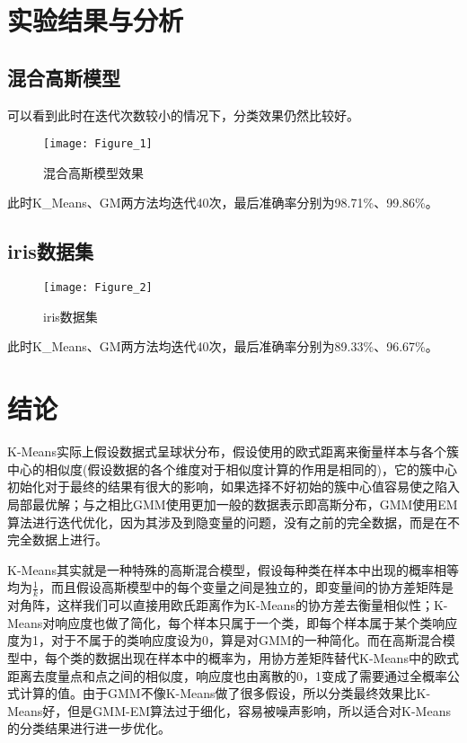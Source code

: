 \documentclass[withoutpreface,bwprint]{cumcmthesis}
\begin{document}
\section{实验结果与分析}
\subsection{混合高斯模型}
可以看到此时在迭代次数较小的情况下，分类效果仍然比较好。

\begin{figure}[H]
    \centering
    \texttt{[image: Figure\_1]}
    \caption{混合高斯模型效果}
    \label{图1}
\end{figure}

此时K\_Means、GM两方法均迭代40次，最后准确率分别为98.71\%、99.86\%。

\subsection{iris数据集}

\begin{figure}[H]
    \centering
    \texttt{[image: Figure\_2]}
    \caption{iris数据集}
    \label{图2}
\end{figure}

此时K\_Means、GM两方法均迭代40次，最后准确率分别为89.33\%、96.67\%。


\section{结论}
K-Means实际上假设数据式呈球状分布，假设使用的欧式距离来衡量样本与各个簇中心的相似度(假设数据的各个维度对于相似度计算的作用是相同的)，它的簇中心初始化对于最终的结果有很大的影响，如果选择不好初始的簇中心值容易使之陷入局部最优解；与之相比GMM使用更加一般的数据表示即高斯分布，GMM使用EM算法进行迭代优化，因为其涉及到隐变量的问题，没有之前的完全数据，而是在不完全数据上进行。

K-Means其实就是一种特殊的高斯混合模型，假设每种类在样本中出现的概率相等均为$\frac{1}{k}$，而且假设高斯模型中的每个变量之间是独立的，即变量间的协方差矩阵是对角阵，这样我们可以直接用欧氏距离作为K-Means的协方差去衡量相似性；K-Means对响应度也做了简化，每个样本只属于一个类，即每个样本属于某个类响应度为1，对于不属于的类响应度设为0，算是对GMM的一种简化。而在高斯混合模型中，每个类的数据出现在样本中的概率为，用协方差矩阵替代K-Means中的欧式距离去度量点和点之间的相似度，响应度也由离散的0，1变成了需要通过全概率公式计算的值。由于GMM不像K-Means做了很多假设，所以分类最终效果比K-Means好，但是GMM-EM算法过于细化，容易被噪声影响，所以适合对K-Means的分类结果进行进一步优化。
\end{document}
